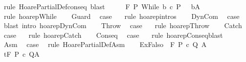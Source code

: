 \begin{isabellebody}
\ {\isacharparenleft}rule\ HoarePartialDef{\isachardot}conseq{\isacharparenright}\ blast\isanewline
\ \ \isamarkupfalse%
\ \isamarkupfalse%
\ {\isachardoublequoteopen}{\isasymGamma}{\isacharcomma}{\isasymTheta}{\isasymturnstile}\isactrlbsub {\isacharslash}F\isactrlesub \ P\ While\ b\ c\ {\isacharparenleft}P\ {\isasyminter}\ {\isacharminus}\ b{\isacharparenright}{\isacharcomma}A{\isachardoublequoteclose}\isanewline
\ \ \ \ \isamarkupfalse%
\ {\isacharparenleft}rule\ hoarep{\isachardot}While{\isacharparenright}\isanewline
{}\isamarkupfalse%
\isanewline
\ \ \isamarkupfalse%
\ Guard\ \isamarkupfalse%
\ {\isacharquery}case\ \isamarkupfalse%
\ {\isacharminus}\ {\isacharparenleft}rule\ hoarep{\isachardot}intros{\isacharparenright}\isanewline
\isanewline
{}\isamarkupfalse%
\isanewline
\ \ \isamarkupfalse%
\ DynCom\ \isamarkupfalse%
\ {\isacharquery}case\ \isamarkupfalse%
\ {\isacharparenleft}blast\ intro{\isacharcolon}\ hoarep{\isachardot}DynCom{\isacharparenright}\isanewline
{}\isamarkupfalse%
\isanewline
\ \ \isamarkupfalse%
\ Throw\ \isamarkupfalse%
\ {\isacharquery}case\ \isamarkupfalse%
\ {\isacharminus}\ {\isacharparenleft}rule\ hoarep{\isachardot}Throw{\isacharparenright}\isanewline
{}\isamarkupfalse%
\isanewline
\ \ \isamarkupfalse%
\ Catch\ \isamarkupfalse%
\ {\isacharquery}case\ \isamarkupfalse%
\ {\isacharminus}\ {\isacharparenleft}rule\ hoarep{\isachardot}Catch{\isacharparenright}\isanewline
{}\isamarkupfalse%
\isanewline
\ \ \isamarkupfalse%
\ Conseq\ \isamarkupfalse%
\ {\isacharquery}case\ \isamarkupfalse%
\ {\isacharminus}\ {\isacharparenleft}rule\ hoarep{\isachardot}Conseq{\isacharcomma}blast{\isacharparenright}\isanewline
{}\isamarkupfalse%
\isanewline
\ \ \isamarkupfalse%
\ Asm\ \isamarkupfalse%
\ {\isacharquery}case\ \isamarkupfalse%
\ {\isacharparenleft}rule\ HoarePartialDef{\isachardot}Asm{\isacharparenright}\isanewline
{}\isamarkupfalse%
\isanewline
\ \ \isamarkupfalse%
\ {\isacharparenleft}ExFalso\ {\isasymTheta}\ F\ P\ c\ Q\ A{\isacharparenright}\isanewline
\ \ \isamarkupfalse%
\ {\isachardoublequoteopen}{\isasymGamma}{\isacharcomma}{\isasymTheta}{\isasymTurnstile}\isactrlsub t\isactrlbsub {\isacharslash}F\isactrlesub \ P\ c\ Q{\isacharcomma}A{\isachardoublequoteclose}\isanewline

\end{isabellebody}

